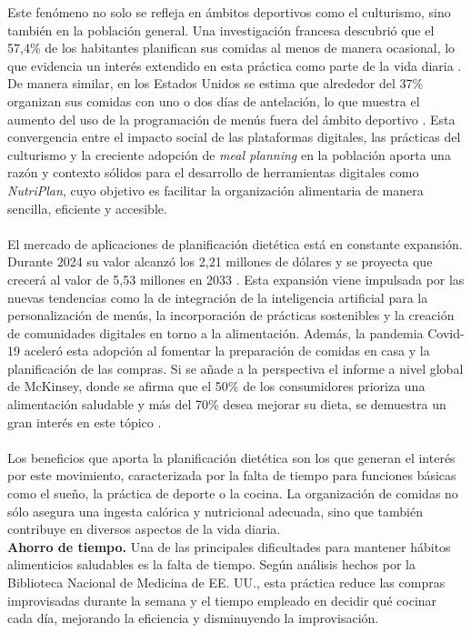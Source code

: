 \documentclass[12pt,a4paper]{report} %
\begin{document}
	Este fenómeno no solo se refleja en ámbitos deportivos como el culturismo, sino también en la población general. Una investigación francesa descubrió que el 57,4\% de los habitantes planifican sus comidas al menos de manera ocasional, lo que evidencia un interés extendido en esta práctica como parte de la vida diaria \cite{ducrot2017}. De manera similar, en los Estados Unidos se estima que alrededor del 37\% organizan sus comidas con uno o dos días de antelación, lo que muestra el aumento del uso de la programación de menús fuera del ámbito deportivo \cite{fmi2015}. Esta convergencia entre el impacto social de las plataformas digitales, las prácticas del culturismo y la creciente adopción de \textit{meal planning} en la población aporta una razón y contexto sólidos para el desarrollo de herramientas digitales como \textit{NutriPlan}, cuyo objetivo es facilitar la organización alimentaria de manera sencilla, eficiente y accesible.
	\\\\
	El mercado de aplicaciones de planificación dietética está en constante expansión. Durante 2024 su valor alcanzó los 2,21 millones de dólares y se proyecta que crecerá al valor de 5,53 millones en 2033 \cite{businessresearchinsights2024}. Esta expansión viene impulsada por las nuevas tendencias como la de integración de la inteligencia artificial para la personalización de menús, la incorporación de prácticas sostenibles y la creación de comunidades digitales en torno a la alimentación. Además, la pandemia Covid-19 aceleró esta adopción al fomentar la preparación de comidas en casa y la planificación de las compras. Si se añade a la perspectiva el informe a nivel global de McKinsey, donde se afirma que el 50\% de los consumidores prioriza una alimentación saludable y más del 70\% desea mejorar su dieta, se demuestra un gran interés en este tópico \cite{mckinsey2023}.
	\\\\
	Los beneficios que aporta la planificación dietética son los que generan el interés por este movimiento, caracterizada por la falta de tiempo para funciones básicas como el sueño, la práctica de deporte o la cocina. La organización de comidas no sólo asegura una ingesta calórica y nutricional adecuada, sino que también contribuye en diversos aspectos de la vida diaria.\\
	\textbf{Ahorro de tiempo.} Una de las principales dificultades para mantener hábitos alimenticios saludables es la falta de tiempo. Según análisis hechos por la Biblioteca Nacional de Medicina de EE. UU., esta práctica reduce las compras improvisadas durante la semana y el tiempo empleado en decidir qué cocinar cada día, mejorando la eficiencia y disminuyendo la improvisación.
\end{document}
